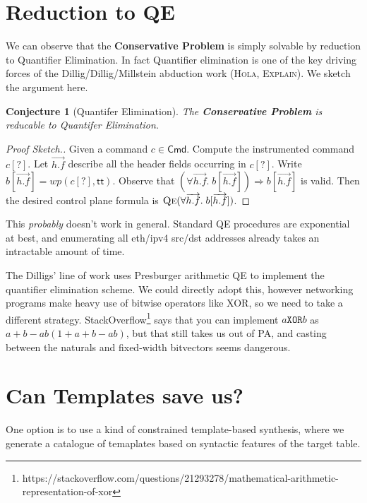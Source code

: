 \documentclass{article}
\newcommand{\TRUE}{\mathsf{tt}}
\newcommand{\Cmd}{\mathsf{Cmd}}
\newcommand{\WP}{\textit{wp}}
\newcommand{\instr}{[?]}
\newcommand{\qe}{\textsc{Qe}}
\newtheorem{conjecture}{Conjecture}
\begin{document}
\section{Reduction to QE}

We can observe that the \textbf{Conservative Problem} is simply solvable by
reduction to Quantifier Elimination. In fact Quantifier elimination is one of
the key driving forces of the Dillig/Dillig/Millstein abduction work (\textsc{Hola},
\textsc{Explain}). We sketch the argument here.

\begin{conjecture}[Quantifer Elimination]
  The \textbf{\textrm{Conservative Problem}} is reducable to Quantifer Elimination.
\end{conjecture}

\begin{proof}[Proof Sketch.]
  Given a command $c \in \Cmd$. Compute the instrumented command $c\instr$. Let
  $\overrightarrow{h.f}$ describe all the header fields occurring in $c\instr$. Write
  $b[\overrightarrow{h.f}] = \WP(c\instr,\TRUE)$. Observe that $(\forall
  \overrightarrow{h.f}.\;b[\overrightarrow{h.f}]) \Rightarrow
  b[\overrightarrow{h.f}]$ is valid. Then the desired control plane formula is $\qe(\forall \overrightarrow{h.f}.\;b[\overrightarrow{h.f}])$.
\end{proof}

This \emph{probably} doesn't work in general. Standard QE procedures are
exponential at best, and enumerating all eth/ipv4 src/dst addresses already
takes an intractable amount of time.

The Dilligs' line of work uses Presburger arithmetic QE to implement the
quantifier elimination scheme. We could directly adopt this, however networking
programs make heavy use of bitwise operators like XOR, so we need to take a
different strategy.
StackOverflow\footnote{https://stackoverflow.com/questions/21293278/mathematical-arithmetic-representation-of-xor}
says that you can implement $a \mathbin{\texttt{XOR}} b$ as $a + b - ab(1 + a +
b - ab)$, but that still takes us out of PA, and casting between the naturals
and fixed-width bitvectors seems dangerous.




\section{Can Templates save us?}

One option is to use a kind of constrained template-based synthesis, where we
generate a catalogue of temaplates based on syntactic features of the target table.
\end{document}
